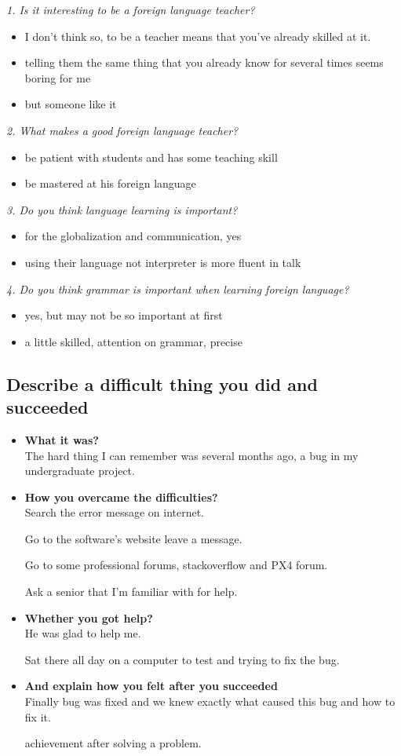 \documentclass[conference]{IEEEtran}
\begin{document}
\textit{1. Is it interesting to be a foreign language teacher?}
\begin{itemize}
    \item I don't think so, to be a teacher means that you've already skilled at it.
    \item telling them the same thing that you already know for several times seems boring for me
    \item but someone like it
\end{itemize}

\textit{2. What makes a good foreign language teacher?}
\begin{itemize}
    \item be patient with students and has some teaching skill
    \item be mastered at his foreign language
\end{itemize}

\textit{3. Do you think language learning is important?}
\begin{itemize}
    \item for the globalization and communication, yes
    \item using their language not interpreter is more fluent in talk
\end{itemize}

\textit{4. Do you think grammar is important when learning foreign language?}
\begin{itemize}
    \item yes, but may not be so important at first
    \item a little skilled, attention on grammar, precise
\end{itemize}

\subsection{Describe a difficult thing you did and succeeded}
\begin{itemize}
    \item \textbf{What it was?}\\
    The hard thing I can remember was several months ago, a bug in my undergraduate project.
    \item \textbf{How you overcame the difficulties?}\\
    Search the error message on internet.

    Go to the software's website leave a message.

    Go to some professional forums, stackoverflow and PX4 forum.

    Ask a senior that I'm familiar with for help.
    \item \textbf{Whether you got help?}\\
    He was glad to help me.

    Sat there all day on a computer to test and trying to fix the bug.
    \item \textbf{And explain how you felt after you succeeded}\\
    Finally bug was fixed and we knew exactly what caused this bug and how to fix it.

    achievement after solving a problem. 
\end{itemize}
\end{document}
